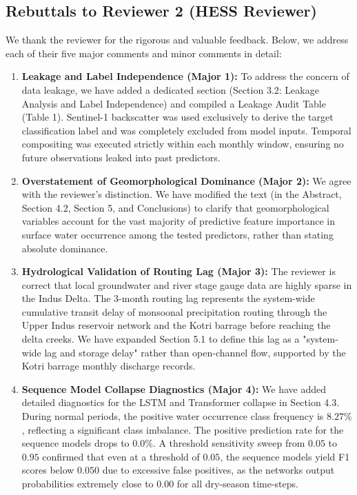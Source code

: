 \subsection*{Rebuttals to Reviewer 2 (HESS Reviewer)}

We thank the reviewer for the rigorous and valuable feedback. Below, we address each of their five major comments and minor comments in detail:

\begin{enumerate}
    \item \textbf{Leakage and Label Independence (Major 1):} To address the concern of data leakage, we have added a dedicated section (Section 3.2: Leakage Analysis and Label Independence) and compiled a Leakage Audit Table (Table 1). Sentinel-1 backscatter was used exclusively to derive the target classification label and was completely excluded from model inputs. Temporal compositing was executed strictly within each monthly window, ensuring no future observations leaked into past predictors.
    \item \textbf{Overstatement of Geomorphological Dominance (Major 2):} We agree with the reviewer's distinction. We have modified the text (in the Abstract, Section 4.2, Section 5, and Conclusions) to clarify that geomorphological variables account for the vast majority of predictive feature importance in surface water occurrence among the tested predictors, rather than stating absolute dominance.
    \item \textbf{Hydrological Validation of Routing Lag (Major 3):} The reviewer is correct that local groundwater and river stage gauge data are highly sparse in the Indus Delta. The 3-month routing lag represents the system-wide cumulative transit delay of monsoonal precipitation routing through the Upper Indus reservoir network and the Kotri barrage before reaching the delta creeks. We have expanded Section 5.1 to define this lag as a "system-wide lag and storage delay" rather than open-channel flow, supported by the Kotri barrage monthly discharge records.
    \item \textbf{Sequence Model Collapse Diagnostics (Major 4):} We have added detailed diagnostics for the LSTM and Transformer collapse in Section 4.3. During normal periods, the positive water occurrence class frequency is $8.27\%$, reflecting a significant class imbalance. The positive prediction rate for the sequence models drops to $0.0\%$. A threshold sensitivity sweep from $0.05$ to $0.95$ confirmed that even at a threshold of $0.05$, the sequence models yield F1 scores below $0.050$ due to excessive false positives, as the networks output probabilities extremely close to $0.00$ for all dry-season time-steps.

\end{enumerate}
